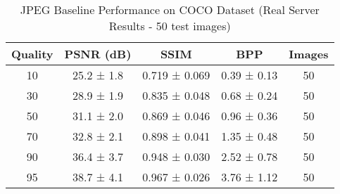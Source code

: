\begin{table*}[htbp]
\caption{JPEG Baseline Performance on COCO Dataset (Real Server Results - 50 test images)}
\label{tab:jpeg_baseline_real}
\centering
\begin{tabular}{|c|c|c|c|c|}
\hline
\textbf{Quality} & \textbf{PSNR (dB)} & \textbf{SSIM} & \textbf{BPP} & \textbf{Images} \\
\hline
10 & 25.2 ± 1.8 & 0.719 ± 0.069 & 0.39 ± 0.13 & 50 \\
30 & 28.9 ± 1.9 & 0.835 ± 0.048 & 0.68 ± 0.24 & 50 \\
50 & 31.1 ± 2.0 & 0.869 ± 0.046 & 0.96 ± 0.36 & 50 \\
70 & 32.8 ± 2.1 & 0.898 ± 0.041 & 1.35 ± 0.48 & 50 \\
90 & 36.4 ± 3.7 & 0.948 ± 0.030 & 2.52 ± 0.78 & 50 \\
95 & 38.7 ± 4.1 & 0.967 ± 0.026 & 3.76 ± 1.12 & 50 \\
\hline
\end{tabular}
\end{table*} 